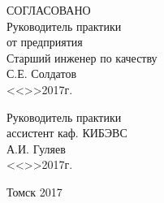 \begin{titlepage}
\begin{minipage}{0.45\textwidth}
 \begin{flushleft}
  СОГЛАСОВАНО \\
  Руководитель практики \\
  от предприятия \\
  Старший инженер по качеству \\
  \underline{\hspace{3cm}}С.Е. Солдатов \\
  <<\underline{\hspace{1cm}}>>\underline{\hspace{3cm}}2017г.\\
 \end{flushleft}
\end{minipage}%
\begin{minipage}{0.45\textwidth}
 \begin{flushleft}
  Руководитель практики \\
  ассистент каф. КИБЭВС \\
  \underline{\hspace{3cm}}А.И. Гуляев \\
  <<\underline{\hspace{1cm}}>>\underline{\hspace{3cm}}2017г.\\
 \end{flushleft}
\end{minipage}

\vfill

\begin{center}
Томск 2017
\end{center}
\end{titlepage}

\clearpage
